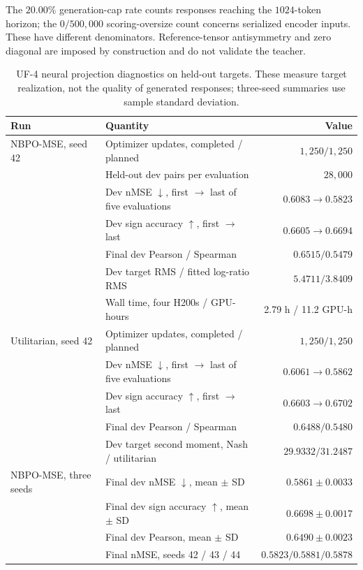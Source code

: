 \documentclass{article}
\theoremstyle{remark}
\theoremstyle{plain}
\begin{document}
The $20.00\%$ generation-cap rate counts responses reaching the $1024$-token horizon; the $0/500{,}000$ scoring-oversize count concerns serialized encoder inputs. These have different denominators. Reference-tensor antisymmetry and zero diagonal are imposed by construction and do not validate the teacher.

\begin{table}[t]
\centering\scriptsize
\setlength{\tabcolsep}{3pt}
\caption{UF-4 neural projection diagnostics on held-out targets. These measure target realization, not the quality of generated responses; three-seed summaries use sample standard deviation.}
\label{tab:uf4-projection-details}
\begin{tabular}{@{}p{}p{}r@{}}
\toprule
Run & Quantity & Value\\
\midrule
NBPO-MSE, seed 42 & Optimizer updates, completed / planned & $1{,}250 / 1{,}250$\\
 & Held-out dev pairs per evaluation & $28{,}000$\\
 & Dev nMSE $\downarrow$, first $\to$ last of five evaluations & $0.6083 \to 0.5823$\\
 & Dev sign accuracy $\uparrow$, first $\to$ last & $0.6605 \to 0.6694$\\
 & Final dev Pearson / Spearman & $0.6515 / 0.5479$\\
 & Dev target RMS / fitted log-ratio RMS & $5.4711 / 3.8409$\\
 & Wall time, four H200s / GPU-hours & \textrm{2.79 h / 11.2 GPU-h}\\
Utilitarian, seed 42 & Optimizer updates, completed / planned & $1{,}250 / 1{,}250$\\
 & Dev nMSE $\downarrow$, first $\to$ last of five evaluations & $0.6061 \to 0.5862$\\
 & Dev sign accuracy $\uparrow$, first $\to$ last & $0.6603 \to 0.6702$\\
 & Final dev Pearson / Spearman & $0.6488 / 0.5480$\\
 & Dev target second moment, Nash / utilitarian & $29.9332 / 31.2487$\\
NBPO-MSE, three seeds & Final dev nMSE $\downarrow$, mean $\pm$ SD & $0.5861 \pm 0.0033$\\
 & Final dev sign accuracy $\uparrow$, mean $\pm$ SD & $0.6698 \pm 0.0017$\\
 & Final dev Pearson, mean $\pm$ SD & $0.6490 \pm 0.0023$\\
 & Final nMSE, seeds 42 / 43 / 44 & $0.5823 / 0.5881 / 0.5878$\\

\end{tabular}
\end{table}
\end{document}
